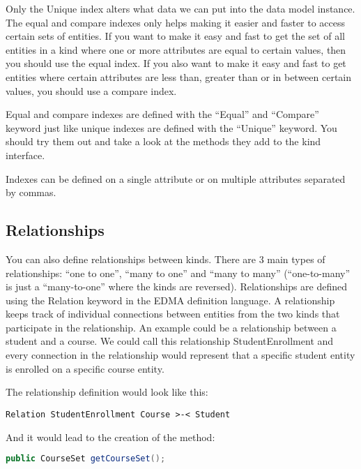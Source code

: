 Only the Unique index alters what data we can put into the data model
instance. The equal and compare indexes only helps making it easier
and faster to access certain sets of entities. If you want to make
it easy and fast to get the set of all entities in a kind where one
or more attributes are equal to certain values, then you should use
the equal index. If you also want to make it easy and fast to get
entities where certain attributes are less than, greater than or in
between certain values, you should use a compare index.

Equal and compare indexes are defined with the ``Equal'' and ``Compare''
keyword just like unique indexes are defined with the ``Unique''
keyword. You should try them out and take a look at the methods they
add to the kind interface.

Indexes can be defined on a single attribute or on multiple attributes
separated by commas.


\subsection{Relationships}

You can also define relationships between kinds. There are 3 main
types of relationships: ``one to one'', ``many to one'' and ``many
to many'' (``one-to-many'' is just a ``many-to-one'' where the
kinds are reversed). Relationships are defined using the Relation
keyword in the EDMA definition language. A relationship keeps track
of individual connections between entities from the two kinds that
participate in the relationship. An example could be a relationship
between a student and a course. We could call this relationship StudentEnrollment
and every connection in the relationship would represent that a specific
student entity is enrolled on a specific course entity.

The relationship definition would look like this:

\begin{lstlisting}[basicstyle={\scriptsize},breaklines=true,tabsize=2]
Relation StudentEnrollment Course >-< Student
\end{lstlisting}


And it would lead to the creation of the method:

\begin{lstlisting}[basicstyle={\scriptsize},language=Java,tabsize=2]
public CourseSet getCourseSet();
\end{lstlisting}


